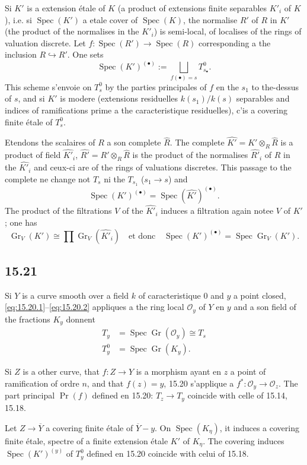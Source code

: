 \documentclass[12pt,a4paper]{article}
\theoremstyle{plain}
\theoremstyle{definition}
\theoremstyle{remark}
\DeclareMathOperator{\Spec}{Spec}
\DeclareMathOperator{\Gr}{Gr}
\newcommand{\cO}{\mathcal{O}}
\begin{document}
Si $K'$ is a extension étale of $K$ (a product of extensions finite separables $K'_i$ of $K$), i.e. si $\Spec(K')$ a etale cover of $\Spec(K)$, the normalise $R'$ of $R$ in $K'$ (the product of the normalises in the $K'_i$) is semi-local, of localises of the rings of valuation discrete. Let $f: \Spec(R') \to \Spec(R)$ corresponding a the inclusion $R \hookrightarrow R'$. One sets
\[
\Spec(K')^{(\bullet)} := \bigsqcup_{f(\bullet) = s} T_{s_\bullet}^0.
\]
This scheme s'envoie on $T_s^0$ by the parties principales of $f$ en the $s_1$ to the-dessus of $s$, and si $K'$ is modere (extensions residuelles $k(s_1)/k(s)$ separables and indices of ramifications prime a the caracteristique residuelles), c'is a covering finite étale of $T_s^0$.

Etendons the scalaires of $R$ a son complete $\hat{R}$. The complete $\widehat{K'} = K' \otimes_R \hat{R}$ is a product of field $\widehat{K'}_i$, $\widehat{R'} = R' \otimes_R \hat{R}$ is the product of the normalises $\widehat{R'}_i$ of $R$ in the $\widehat{K'}_i$ and ceux-ci are of the rings of valuations discretes. This passage to the complete ne change not $T_s$ ni the $T_{s_1}$ ($s_1 \to s$) and
\[
\Spec(K')^{(\bullet)} = \Spec(\widehat{K'})^{(\bullet)}.
\]
The product of the filtrations $V$ of the $\widehat{K'}_i$ induces a filtration again notee $V$ of $K'$; one has
\[
\Gr_V(K') \cong \prod \Gr_V(\widehat{K'}_i) \quad \text{et donc} \quad \Spec(K')^{(\bullet)} = \Spec \Gr_V(K').
\]

\subsection*{15.21}

Si $Y$ is a curve smooth over a field $k$ of caracteristique $0$ and $y$ a point closed, \eqref{eq:15.20.1}--\eqref{eq:15.20.2} appliques a the ring local $\cO_y$ of $Y$ en $y$ and a son field of the fractions $K_y$ donnent
\begin{align*}
T_y &= \Spec \Gr(\cO_y) \cong T_s \\
T_y^0 &= \Spec \Gr(K_y).
\end{align*}

Si $Z$ is a other curve, that $f: Z \to Y$ is a morphism ayant en $z$ a point of ramification of ordre $n$, and that $f(z) = y$, 15.20 s'applique a $f^*: \cO_y \to \cO_z$. The part principal $\Pr(f)$ defined en 15.20: $T_z \to T_y$ coincide with celle of 15.14, 15.18.

Let $Z \to \overline{Y}$ a covering finite étale of $\overline{Y} - y$. On $\Spec(K_\eta)$, it induces a covering finite étale, spectre of a finite extension étale $K'$ of $K_\eta$. The covering induces $\Spec(K')^{(y)}$ of $T_y^0$ defined en 15.20 coincide with celui of 15.18.
\end{document}
